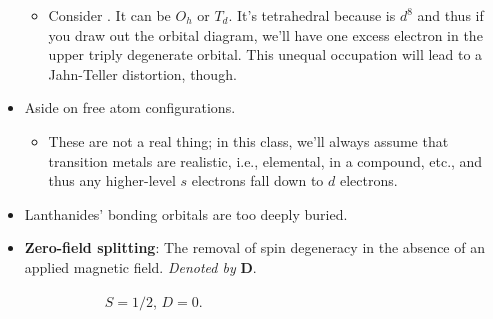 \documentclass[../notes.tex]{subfiles}
\begin{document}
\begin{itemize}
    \begin{itemize}
        \item Consider . It can be $O_h$ or $T_d$. It's tetrahedral because  is $d^8$ and thus if you draw out the orbital diagram, we'll have one excess electron in the upper triply degenerate orbital. This unequal occupation will lead to a Jahn-Teller distortion, though.
    \end{itemize}
    \item Aside on free atom configurations.
    \begin{itemize}
        \item These are not a real thing; in this class, we'll always assume that transition metals are realistic, i.e., elemental, in a compound, etc., and thus any higher-level $s$ electrons fall down to $d$ electrons.
    \end{itemize}
    \item Lanthanides' bonding orbitals are too deeply buried.
    \item \textbf{Zero-field splitting}: The removal of spin degeneracy in the absence of an applied magnetic field. \emph{Denoted by} $\bm{D}$.
    \begin{figure}[h!]
        \centering
        \footnotesize
        \begin{subfigure}[b]{0.49\linewidth}
            \centering
            \caption{$S=1/2$, $D=0$.}
            \label{fig:zeroFieldSplita}
        \end{subfigure}
        \begin{subfigure}[b]{0.49\linewidth}
            \centering
\end{subfigure}
\end{figure}
\end{itemize}
\end{document}
